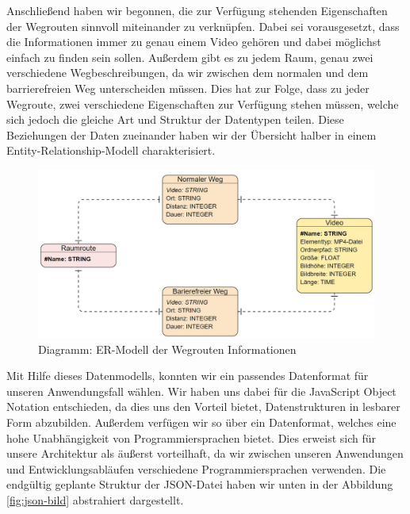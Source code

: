 Anschließend haben wir begonnen, die zur Verfügung stehenden Eigenschaften der Wegrouten sinnvoll miteinander zu verknüpfen.%
Dabei sei vorausgesetzt, dass die Informationen immer zu genau einem Video gehören und dabei möglichst einfach zu finden sein sollen. Außerdem gibt es zu jedem Raum, genau zwei verschiedene Wegbeschreibungen, da wir zwischen dem normalen und dem barrierefreien Weg unterscheiden müssen. Dies hat zur Folge, dass zu jeder Wegroute, zwei verschiedene Eigenschaften zur Verfügung stehen müssen, welche sich jedoch die gleiche Art und Struktur der Datentypen teilen. Diese Beziehungen der Daten zueinander haben wir der Übersicht halber in einem Entity-Relationship-Modell charakterisiert.

\begin{figure}[H]
    \includegraphics[width=\textwidth]{Figures/3DNavigator/EntityrelationshipdiagrammRaumfinder.jpg}
    \caption{Diagramm: ER-Modell der Wegrouten Informationen}
    \label{fig:integration}
    \centering
\end{figure}

Mit Hilfe dieses Datenmodells, konnten wir ein passendes Datenformat für unseren Anwendungsfall wählen. Wir haben uns dabei für die JavaScript Object Notation entschieden, da dies uns den Vorteil bietet, Datenstrukturen in lesbarer Form abzubilden. Außerdem verfügen wir so über ein Datenformat, welches eine hohe Unabhängigkeit von Programmiersprachen bietet. Dies erweist sich für unsere Architektur als äußerst vorteilhaft, da wir zwischen unseren Anwendungen und Entwicklungsabläufen verschiedene Programmiersprachen verwenden. Die endgültig geplante Struktur der JSON-Datei haben wir unten in der Abbildung \ref{fig:json-bild} abstrahiert dargestellt.

